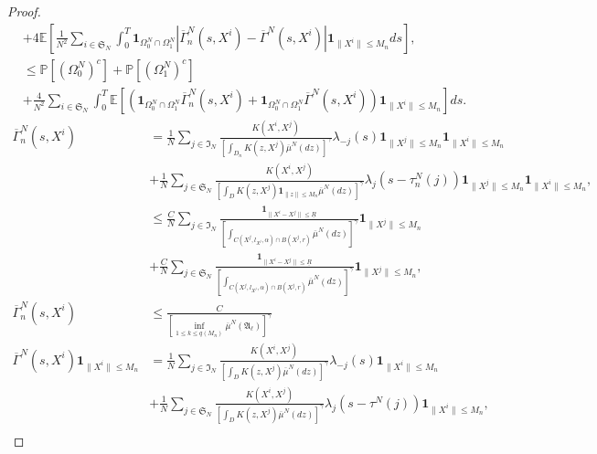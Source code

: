 \documentclass[notitlepage,reqno,11pt]{amsart}
\numberwithin{equation}{section}
\begin{document}
\begin{proof}
\begin{align*}
&+ 4 \mathbb{E}\left[\frac{1}{N^2}\sum_{i\in\mathfrak{S}_N}\int_{0}^{T}\mathbf{1}_{\Omega_0^N \cap \Omega_1^N}\left|\overline{\Gamma}_{n}^{N}(s,X^i)-\overline{\Gamma}^{N}(s,X^i)\right|\mathbf{1}_{\|X^i\|\leq M_n}ds\right],\\
&\leq \mathbb{P}\left[\left( \Omega_0^N \right)^c\right]+\mathbb{P}\left[\left( \Omega_1^N \right)^c\right]\\
&+\frac{4}{N^2}\sum_{i\in\mathfrak{S}_N}\int_{0}^{T} \mathbb{E}\left[ \left(\mathbf{1}_{\Omega_0^N \cap \Omega_1^N}\overline{\Gamma}_{n}^{N}(s,X^i)+\mathbf{1}_{\Omega_0^N \cap \Omega_1^N} \overline{\Gamma}^{N}(s,X^i)\right)\mathbf{1}_{\|X^i\|\leq M_n}\right]ds.
\end{align*}
\begin{align*}
\overline{\Gamma}_{n}^{N}(s,X^i)&= \frac{1}{N} \displaystyle \sum_{j\in\mathfrak{I}_N} \frac{K(X^{i},X^{j})}{\left[\displaystyle \int_{D_n} K(z,X^j)\overline{\mu}^N(dz)\right]^{\gamma}} \lambda_{-j}(s) \mathbf{1}_{\|X^j\|\leq M_n}\mathbf{1}_{\|X^i\|\leq M_n}\\
&+\frac{1}{N} \sum_{j\in\mathfrak{S}_N} \frac{K(X^{i},X^{j})}{\left[\displaystyle \int_D K(z,X^j)\mathbf{1}_{\|z\|\leq M_n}\overline{\mu}^N(dz)\right]^{\gamma}}\lambda_{j}(s- \tau_{n}^N(j)) \mathbf{1}_{\|X^j\|\leq M_n}\mathbf{1}_{\|X^i\|\leq M_n},\\
&\leq \frac{C}{N} \displaystyle \sum_{j\in\mathfrak{I}_N} \frac{\mathbf{1}_{\|X^i-X^j\|\leq \underline{R}}}{\left[\displaystyle \int_{C(X^j,l_{X^j},\alpha)\cap B(X^j,r)} \overline{\mu}^N(dz)\right]^{\gamma}}  \mathbf{1}_{\|X^j\|\leq M_n}\\
&+\frac{C}{N} \displaystyle \sum_{j\in\mathfrak{S}_N} \frac{\mathbf{1}_{\|X^i-X^j\|\leq \underline{R}}}{\left[\displaystyle \int_{C(X^j,l_{X^j},\alpha) \cap B(X^j,r)} \overline{\mu}^N(dz)\right]^{\gamma}}  \mathbf{1}_{\|X^j\|\leq M_n},\\
\overline{\Gamma}_{n}^{N}(s,X^i)&\leq  \frac{C}{\left[\displaystyle  \inf_{1\leq k\leq q(M_n)}\overline{\mu}^N(\mathfrak{A}_\ell)\right]^\gamma} \\
\overline{\Gamma}^{N}(s,X^i)\mathbf{1}_{\|X^i\|\leq M_n}&= \frac{1}{N} \displaystyle \sum_{j\in\mathfrak{I}_N} \frac{K(X^{i},X^{j})}{\left[\displaystyle \int_{D} K(z,X^j)\overline{\mu}^N(dz)\right]^{\gamma}} \lambda_{-j}(s)\mathbf{1}_{\|X^i\|\leq M_n} \\
&+\frac{1}{N} \sum_{j\in\mathfrak{S}_N} \frac{K(X^{i},X^{j})}{\left[\displaystyle \int_D K(z,X^j)\overline{\mu}^N(dz)\right]^{\gamma}}\lambda_{j}(s- \tau^N(j)) \mathbf{1}_{\|X^i\|\leq M_n},\\

\end{align*}
\end{proof}
\end{document}

